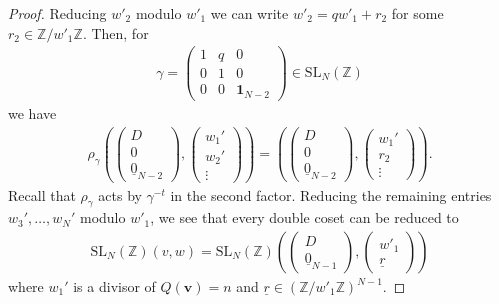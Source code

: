 \documentclass[a4paper,11pt]{amsart} %
\newcommand{\8}{\infty}
\newcommand{\Z}{\mathbb{Z}}
\newcommand{\id}{\mathbf{1}}
\newcommand{\Obf}{\underline{0}}
\newcommand{\vbf}{\mathbf{v}}
\newcommand{\SL}{\mathrm{SL}}
\theoremstyle{mytheoremstyle}
\theoremstyle{remark}
\numberwithin{equation}{section}
\begin{document}
\begin{proof}
Reducing $w'_2$ modulo $ w'_1$ we can write $w'_2=q w'_1+r_2$ for some $r_2 \in \Z/w'_1 \Z$. Then, for
\begin{align}
    \gamma=\begin{pmatrix}
        1 & q & 0 \\
        0 & 1 & 0 \\
        0 & 0 & \id_{N-2}
    \end{pmatrix} \in \SL_N(\Z)
\end{align} we have
\begin{align} \label{representatives}
    \rho_{\gamma}\left (\begin{pmatrix}
        D \\ 0 \\ \Obf_{N-2}
    \end{pmatrix},\begin{pmatrix}
        w_1' \\ w_2' \\ \vdots
    \end{pmatrix} \right )= \left ( \begin{pmatrix}
        D \\ 0 \\ \Obf_{N-2}
    \end{pmatrix},\begin{pmatrix}
        w_1' \\ r_2 \\ \vdots
    \end{pmatrix} \right ).
\end{align}
Recall that $\rho_\gamma$ acts by $\gamma^{-t}$ in the second factor. Reducing the remaining entries $w_3', \dots, w_N'$ modulo $w'_1$, we see that every double coset can be reduced to
\begin{align}
    \SL_N(\Z)(v,w)=\SL_N(\Z) \left (\begin{pmatrix}
        D \\ \Obf_{N-1}
    \end{pmatrix},\begin{pmatrix}
        w'_1 \\ \underline{r}
    \end{pmatrix} \right )
\end{align}
where $w_1'$ is a divisor of $Q(\vbf)=n$ and $\underline{r} \in (\Z/ w'_1\Z)^{N-1}$.
\end{proof}
\end{document}
